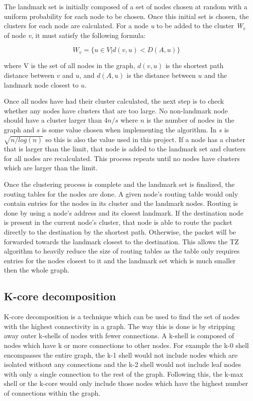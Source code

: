 \documentclass{dissertation/mpaper}
\begin{document}
The landmark set is initially composed of a set of nodes chosen at random with a uniform probability for each node to be chosen. Once this initial set is chosen, the clusters for each node are calculated. For a node \textit{u} to be added to the cluster \textit{W$_v$} of node \textit{v}, it must satisfy the following formula:

\[W_v = \{u \in V | d(v,u) < D(A,u)\}\]

where V is the set of all nodes in the graph, $d(v,u)$ is the shortest path distance between $v$ and $u$, and $d(A,u)$ is the distance between $u$ and the landmark node closest to $u$.

Once all nodes have had their cluster calculated, the next step is to check whether any nodes have clusters that are too large. No non-landmark node should have a cluster larger than $4n/s$ where $n$ is the number of nodes in the graph and $s$ is some value chosen when implementing the algorithm. In \cite{thorup} $s$ is $\sqrt{n/log(n)}$ so this is also the value used in this project. If a node has a cluster that is larger than the limit, that node is added to the landmark set and clusters for all nodes are recalculated. This process repeats until no nodes have clusters which are larger than the limit. 

Once the clustering process is complete and the landmark set is finalized, the routing tables for the nodes are done. A given node's routing table would only contain entries for the nodes in its cluster and the landmark nodes. Routing is done by using a node's address and its closest landmark. If the destination node is present in the current node's cluster, that node is able to route the packet directly to the destination by the shortest path. Otherwise, the packet will be forwarded towards the landmark closest to the destination. This allows the TZ algorithm to heavily reduce the size of routing tables as the table only requires entries for the nodes closest to it and the landmark set which is much smaller then the whole graph.
 
\subsection{K-core decomposition}

K-core decomposition is a technique which can be used to find the set of nodes with the highest connectivity in a graph. The way this is done is by stripping away outer k-shells of nodes with fewer connections. A k-shell is composed of nodes which have k or more connections to other nodes. For example the k-0 shell encompasses the entire graph, the k-1 shell would not include nodes which are isolated without any connections and the k-2 shell would not include leaf nodes with only a single connection to the rest of the graph. Following this, the k-max shell or the k-core would only include those nodes which have the highest number of connections within the graph.
\end{document}

